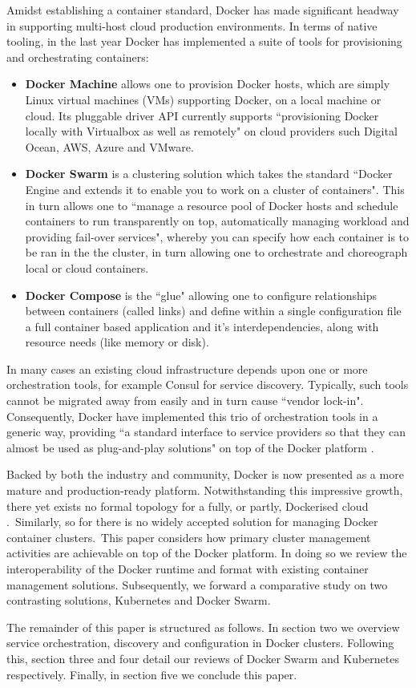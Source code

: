 \documentclass{article}
\begin{document}
\par
Amidst establishing a container standard, Docker has made significant headway in
supporting multi-host cloud production environments. In terms of native tooling, in the last year Docker has implemented
a suite of tools for provisioning and orchestrating containers:
\begin{itemize}
\item \textbf{Docker Machine} allows one to provision Docker hosts, which are simply Linux virtual machines (VMs) supporting Docker, on a local machine or cloud.
Its pluggable driver API currently supports ``provisioning Docker locally with Virtualbox as well as remotely" on cloud providers such Digital Ocean, AWS, Azure and VMware.
\item \textbf{Docker Swarm} is a clustering solution which takes the standard
``Docker Engine and extends it to enable you to work on a cluster of containers".
This in turn allows one to ``manage a resource pool of Docker hosts and schedule
containers to run transparently on top, automatically managing workload and providing fail-over services", whereby you can specify how each container is to be ran in the the cluster, in turn allowing one to orchestrate and choreograph local or cloud containers.
\item \textbf{Docker Compose} is the ``glue" allowing one to configure relationships between containers (called links) and define within a single configuration file a full container based application and it's interdependencies, along with resource needs (like memory or disk).
\end{itemize}
\noindent In many cases an existing cloud infrastructure depends upon one or more orchestration tools, for example
Consul for service discovery. Typically, such tools cannot be migrated away from easily and in turn cause ``vendor lock-in".
Consequently, Docker have implemented this trio of orchestration tools in a generic way,
providing ``a standard interface to service providers so that they can almost be used as plug-and-play solutions" on top of the Docker platform \citep{holla}.
\par
Backed by both the industry and community, Docker is now presented as a more mature and production-ready
platform. Notwithstanding this impressive growth, there yet exists no
formal topology for a fully, or partly, Dockerised cloud \citep{Claus}.\ Similarly,
so for there is no widely accepted solution for managing
Docker container clusters.\
 This paper considers how primary cluster management activities are achievable on top of the Docker platform.
In doing so we review the interoperability of the Docker runtime and format with existing
container management solutions. Subsequently, we forward a comparative study
on two contrasting solutions, Kubernetes and Docker Swarm.
\par
The remainder of this paper is structured as follows. In
section two we overview service orchestration, discovery and configuration in Docker clusters. Following this, section three and four detail our
reviews of Docker Swarm and Kubernetes respectively. Finally, in section five we conclude this paper.
\end{document}
